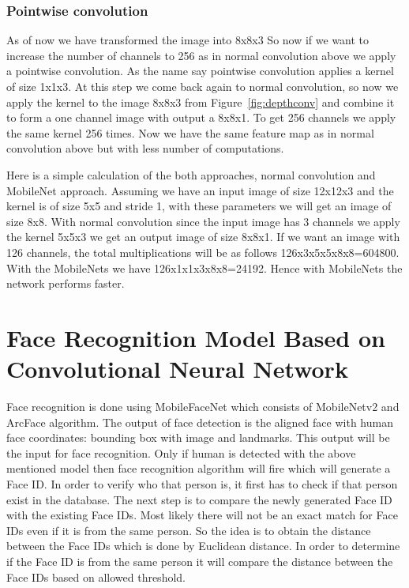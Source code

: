 \subsubsection{Pointwise convolution}
As of now we have transformed the image into 8x8x3
So now if we want to increase the number of channels to 256 as in normal convolution above we apply a pointwise convolution. As the name say pointwise convolution applies a kernel of size 1x1x3. At this step we come back again to normal convolution, so now we apply the kernel to the image 8x8x3 from Figure~\ref{fig:depthconv} and combine it to form a one channel image with output a 8x8x1. To get 256 channels we apply the same kernel 256 times. Now we have the same feature map as in normal convolution above but with less number of computations. 

Here is a simple calculation of the both approaches, normal convolution and MobileNet approach. 
Assuming we have an input image of size 12x12x3 and the kernel is of size 5x5 and stride 1, with these parameters we will get an image of size 8x8.
With normal convolution since the input image has 3 channels we apply the kernel 5x5x3 we get an output image of size 8x8x1. If we want an image with 126 channels, the total multiplications will be as follows 126x3x5x5x8x8=604800. With the MobileNets we have 126x1x1x3x8x8=24192. Hence with MobileNets the network performs faster.


\section{Face Recognition Model Based on Convolutional Neural Network}

Face recognition is done using MobileFaceNet \cite{DBLP:journals/corr/HowardZCKWWAA17} which consists of MobileNetv2 \cite{DBLP:journals/corr/abs-1801-04381} and ArcFace algorithm. The output of face detection is the aligned face with human face coordinates: bounding box with image and landmarks. This output will be the input for face recognition. Only if human is detected with the above mentioned model then face recognition algorithm will fire which will generate a Face ID. In order to verify who that person is, it first has to check if that person exist in the database. The next step is to compare the newly generated Face ID with the existing Face IDs. Most likely there will not be an exact match for Face IDs even if it is from the same person. So the idea is to obtain the distance between the Face IDs which is done by Euclidean distance. In order to determine if the Face ID is from the same person it will compare the distance between the Face IDs based on allowed threshold. 


